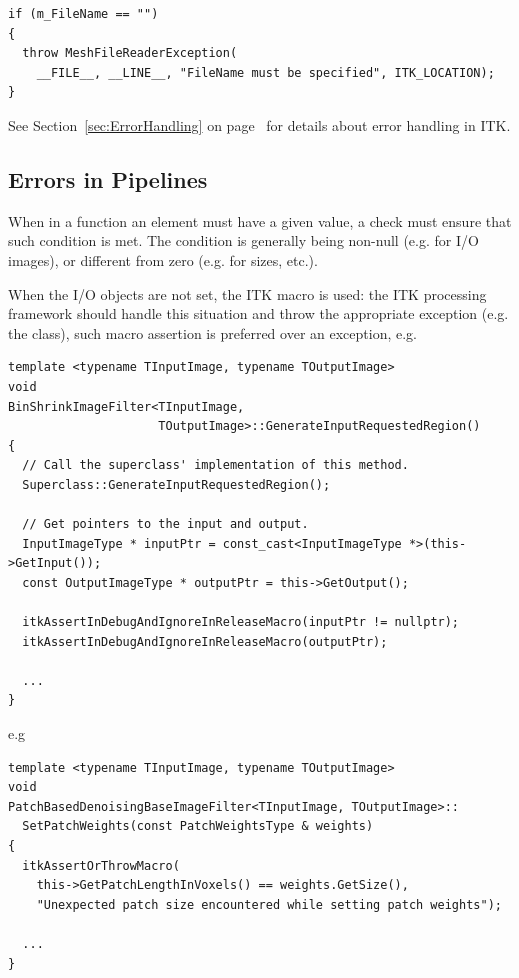 \small
\begin{verbatim}
if (m_FileName == "")
{
  throw MeshFileReaderException(
    __FILE__, __LINE__, "FileName must be specified", ITK_LOCATION);
}
\end{verbatim}
\normalsize

See Section~\ref{sec:ErrorHandling} on page~\pageref{sec:ErrorHandling} for
details about error handling in ITK.


\subsection{Errors in Pipelines}%
\label{subsec:ErrorsInPipelines}

When in a function an element must have a given value, a check must ensure that
such condition is met. The condition is generally being non-null (e.g. for I/O
images), or different from zero (e.g. for sizes, etc.).

When the I/O objects are not set, the ITK
 macro is used: the ITK processing
framework should handle this situation and throw the appropriate exception (e.g.
the  class), such macro assertion is preferred over
an exception, e.g.

\small
\begin{verbatim}
template <typename TInputImage, typename TOutputImage>
void
BinShrinkImageFilter<TInputImage,
                     TOutputImage>::GenerateInputRequestedRegion()
{
  // Call the superclass' implementation of this method.
  Superclass::GenerateInputRequestedRegion();

  // Get pointers to the input and output.
  InputImageType * inputPtr = const_cast<InputImageType *>(this->GetInput());
  const OutputImageType * outputPtr = this->GetOutput();

  itkAssertInDebugAndIgnoreInReleaseMacro(inputPtr != nullptr);
  itkAssertInDebugAndIgnoreInReleaseMacro(outputPtr);

  ...
}
\end{verbatim}
\normalsize

e.g

\small
\begin{verbatim}
template <typename TInputImage, typename TOutputImage>
void
PatchBasedDenoisingBaseImageFilter<TInputImage, TOutputImage>::
  SetPatchWeights(const PatchWeightsType & weights)
{
  itkAssertOrThrowMacro(
    this->GetPatchLengthInVoxels() == weights.GetSize(),
    "Unexpected patch size encountered while setting patch weights");

  ...
}
\end{verbatim}
\normalsize

